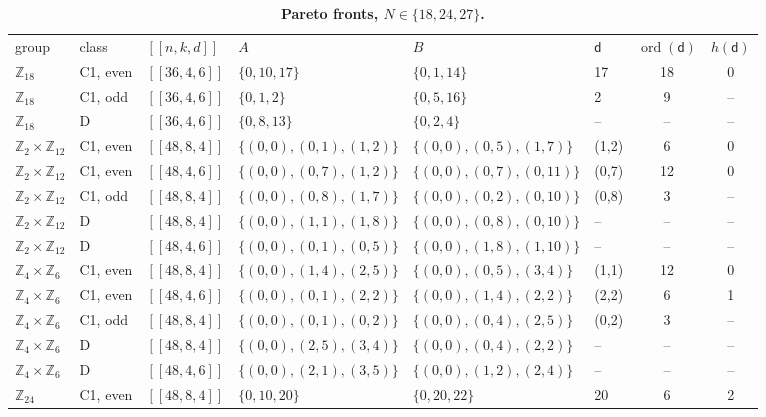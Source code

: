 \documentclass[reprint,twocolumn,superscriptaddress,nofootinbib]{revtex4-2}
\theoremstyle{plain}
\newcommand{\col}{\mathsf{d}}          %
\begin{document}
\begin{table}[!t]
\caption{\textbf{Pareto fronts, $N\in\{18,24,27\}$.}}
\label{tab:codes-a}
\footnotesize
\begin{ruledtabular}
\begin{tabular}{llllllcc}
group & class & $[[n,k,d]]$ & $A$ & $B$ & $\col$ & $\operatorname{ord}(\col)$ & $h(\col)$ \\
\colrule
$\mathbb{Z}_{18}$ & C1, even & $[[36,4,6]]$ & $\{0,10,17\}$ & $\{0,1,14\}$ & 17 & 18 & 0 \\
$\mathbb{Z}_{18}$ & C1, odd & $[[36,4,6]]$ & $\{0,1,2\}$ & $\{0,5,16\}$ & 2 & 9 & -- \\
$\mathbb{Z}_{18}$ & D & $[[36,4,6]]$ & $\{0,8,13\}$ & $\{0,2,4\}$ & -- & -- & -- \\
$\mathbb{Z}_{2}\times\mathbb{Z}_{12}$ & C1, even & $[[48,8,4]]$ & $\{(0,0),(0,1),(1,2)\}$ & $\{(0,0),(0,5),(1,7)\}$ & (1,2) & 6 & 0 \\
$\mathbb{Z}_{2}\times\mathbb{Z}_{12}$ & C1, even & $[[48,4,6]]$ & $\{(0,0),(0,7),(1,2)\}$ & $\{(0,0),(0,7),(0,11)\}$ & (0,7) & 12 & 0 \\
$\mathbb{Z}_{2}\times\mathbb{Z}_{12}$ & C1, odd & $[[48,8,4]]$ & $\{(0,0),(0,8),(1,7)\}$ & $\{(0,0),(0,2),(0,10)\}$ & (0,8) & 3 & -- \\
$\mathbb{Z}_{2}\times\mathbb{Z}_{12}$ & D & $[[48,8,4]]$ & $\{(0,0),(1,1),(1,8)\}$ & $\{(0,0),(0,8),(0,10)\}$ & -- & -- & -- \\
$\mathbb{Z}_{2}\times\mathbb{Z}_{12}$ & D & $[[48,4,6]]$ & $\{(0,0),(0,1),(0,5)\}$ & $\{(0,0),(1,8),(1,10)\}$ & -- & -- & -- \\
$\mathbb{Z}_{4}\times\mathbb{Z}_{6}$ & C1, even & $[[48,8,4]]$ & $\{(0,0),(1,4),(2,5)\}$ & $\{(0,0),(0,5),(3,4)\}$ & (1,1) & 12 & 0 \\
$\mathbb{Z}_{4}\times\mathbb{Z}_{6}$ & C1, even & $[[48,4,6]]$ & $\{(0,0),(0,1),(2,2)\}$ & $\{(0,0),(1,4),(2,2)\}$ & (2,2) & 6 & 1 \\
$\mathbb{Z}_{4}\times\mathbb{Z}_{6}$ & C1, odd & $[[48,8,4]]$ & $\{(0,0),(0,1),(0,2)\}$ & $\{(0,0),(0,4),(2,5)\}$ & (0,2) & 3 & -- \\
$\mathbb{Z}_{4}\times\mathbb{Z}_{6}$ & D & $[[48,8,4]]$ & $\{(0,0),(2,5),(3,4)\}$ & $\{(0,0),(0,4),(2,2)\}$ & -- & -- & -- \\
$\mathbb{Z}_{4}\times\mathbb{Z}_{6}$ & D & $[[48,4,6]]$ & $\{(0,0),(2,1),(3,5)\}$ & $\{(0,0),(1,2),(2,4)\}$ & -- & -- & -- \\
$\mathbb{Z}_{24}$ & C1, even & $[[48,8,4]]$ & $\{0,10,20\}$ & $\{0,20,22\}$ & 20 & 6 & 2 \\

\end{tabular}
\end{ruledtabular}
\end{table}
\end{document}
